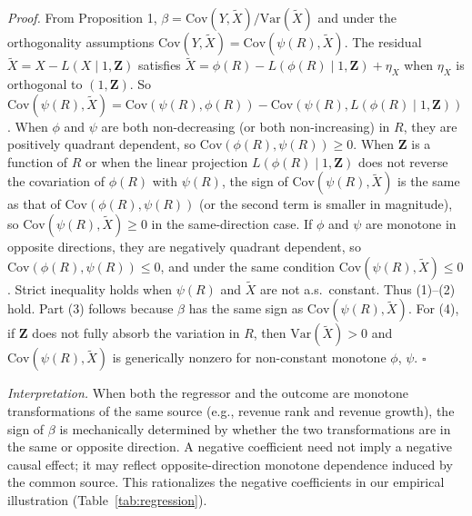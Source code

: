 \noindent\textit{Proof.} From Proposition 1, $\beta = \mathrm{Cov}(Y, \tilde{X}) / \mathrm{Var}(\tilde{X})$ and under the orthogonality assumptions $\mathrm{Cov}(Y, \tilde{X}) = \mathrm{Cov}(\psi(R), \tilde{X})$. The residual $\tilde{X} = X - L(X \mid 1, \mathbf{Z})$ satisfies $\tilde{X} = \phi(R) - L(\phi(R) \mid 1, \mathbf{Z}) + \eta_X$ when $\eta_X$ is orthogonal to $(1, \mathbf{Z})$. So $\mathrm{Cov}(\psi(R), \tilde{X}) = \mathrm{Cov}(\psi(R), \phi(R)) - \mathrm{Cov}(\psi(R), L(\phi(R) \mid 1, \mathbf{Z}))$. When $\phi$ and $\psi$ are both non-decreasing (or both non-increasing) in $R$, they are positively quadrant dependent, so $\mathrm{Cov}(\phi(R), \psi(R)) \geq 0$. When $\mathbf{Z}$ is a function of $R$ or when the linear projection $L(\phi(R) \mid 1, \mathbf{Z})$ does not reverse the covariation of $\phi(R)$ with $\psi(R)$, the sign of $\mathrm{Cov}(\psi(R), \tilde{X})$ is the same as that of $\mathrm{Cov}(\phi(R), \psi(R))$ (or the second term is smaller in magnitude), so $\mathrm{Cov}(\psi(R), \tilde{X}) \geq 0$ in the same-direction case. If $\phi$ and $\psi$ are monotone in opposite directions, they are negatively quadrant dependent, so $\mathrm{Cov}(\phi(R), \psi(R)) \leq 0$, and under the same condition $\mathrm{Cov}(\psi(R), \tilde{X}) \leq 0$. Strict inequality holds when $\psi(R)$ and $\tilde{X}$ are not a.s.\ constant. Thus (1)--(2) hold. Part (3) follows because $\beta$ has the same sign as $\mathrm{Cov}(\psi(R), \tilde{X})$. For (4), if $\mathbf{Z}$ does not fully absorb the variation in $R$, then $\mathrm{Var}(\tilde{X}) > 0$ and $\mathrm{Cov}(\psi(R), \tilde{X})$ is generically nonzero for non-constant monotone $\phi$, $\psi$. \hfill $\square$

\noindent\textit{Interpretation.} When both the regressor and the outcome are monotone transformations of the same source (e.g., revenue rank and revenue growth), the sign of $\beta$ is mechanically determined by whether the two transformations are in the same or opposite direction. A negative coefficient need not imply a negative causal effect; it may reflect opposite-direction monotone dependence induced by the common source. This rationalizes the negative coefficients in our empirical illustration (Table~\ref{tab:regression}).

